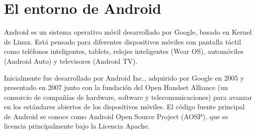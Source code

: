 \chapter{El entorno de Android}

Android es un sistema operativo móvil desarrollado por Google, basado en Kernel de Linux. Está pensado para diferentes dispositivos móviles con pantalla táctil como teléfonos inteligentes, tablets, relojes inteligentes (Wear OS), automóviles (Android Auto) y televisores (Android TV).

Inicialmente fue desarrollado por Android Inc., adquirido por Google en 2005 y presentado en 2007 junto con la fundación del Open Handset Alliance (un consorcio de compañías de hardware, software y telecomunicaciones) para avanzar en los estándares abiertos de los dispositivos móviles. El código fuente principal de Android se conoce como Android Open Source Project (AOSP), que se licencia principalmente bajo la Licencia Apache. 


